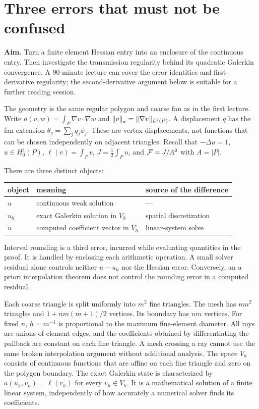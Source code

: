 \section{Three errors that must not be confused}
\label{l2:errors}
\noindent\textbf{Aim.} Turn a finite element Hessian entry into an enclosure
of the continuous entry. Then investigate the transmission regularity
behind its quadratic Galerkin convergence. A 90-minute lecture can cover
the error identities and first-derivative regularity; the second-derivative
argument below is suitable for a further reading session.

The geometry is the same regular polygon and coarse fan as in the first
lecture. Write $a(v,w)=\int_P\nabla v\cdot\nabla w$ and
$\left\|v\right\|_a=\|\nabla v\|_{L^2(P)}$. A displacement $q$ has the fan extension
$\theta_q=\sum_jq_j\phi_j$. These are vertex displacements, not functions
that can be chosen independently on adjacent triangles.
Recall that $-\Delta u=1$, $u\in H^1_0(P)$, $\ell(v)=\int_Pv$,
$J=\frac12\int_Pu$, and $\mathcal F=J/A^2$ with $A=|P|$.

There are three distinct objects:
\begin{center}
\begin{tabular}{lll}\toprule
object & meaning & source of the difference\\\midrule
$u$ & continuous weak solution & ---\\
$u_h$ & exact Galerkin solution in $V_h$ & spatial discretization\\
$\widetilde u$ & computed coefficient vector in $V_h$ & linear-system solve\\\bottomrule
\end{tabular}
\end{center}
Interval rounding is a third error, incurred while evaluating quantities
in the proof. It is handled by enclosing each arithmetic operation.
A small solver residual alone controls neither $u-u_h$ nor the Hessian
error. Conversely, an a priori interpolation theorem does not control the
rounding error in a computed residual.

Each coarse triangle is split uniformly into $m^2$ fine triangles. The
mesh has $nm^2$ triangles and $1+nm(m+1)/2$ vertices. Its boundary has
$nm$ vertices. For fixed $n$, $h=m^{-1}$ is proportional to the maximum
fine-element diameter. All rays are unions of element edges, and the
coefficients obtained by differentiating the pullback are constant on each
fine triangle. A mesh crossing a ray cannot use the same broken
interpolation argument without additional analysis.
The space $V_h$ consists of continuous functions that are affine on each
fine triangle and zero on the polygon boundary. The exact Galerkin state
is characterized by $a(u_h,v_h)=\ell(v_h)$ for every $v_h\in V_h$.
It is a mathematical solution of a finite linear system, independently
of how accurately a numerical solver finds its coefficients.

